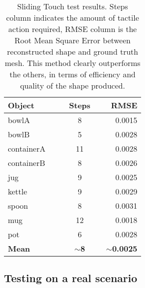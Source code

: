\begin{table}
    \centering
    \begin{tabularx}{0.95\columnwidth}{lccccr}
        \toprule
        Object & & & Steps && RMSE \\
        \midrule
        bowlA & & &8 && 0.0015\\
        bowlB & & &5 && 0.0028\\
        containerA &&& 11 && 0.0028\\
        containerB &&& 8 && 0.0026\\
        jug &&& 9 && 0.0025\\
        kettle &&& 9 && 0.0029\\
        spoon &&& 8 && 0.0031\\
        mug &&& 12 && 0.0018\\
        pot &&& 6 && 0.0028\\
        \midrule
        \textbf{Mean} &&& $\sim$\textbf{8} && $\sim$\textbf{0.0025}\\
        \bottomrule
    \end{tabularx}
    \caption{Sliding Touch test results. Steps column indicates the amount of tactile action required, RMSE
    column is the Root Mean Square Error between reconstructed shape and ground truth mesh. This method clearly
outperforms the others, in terms of efficiency and quality of the shape produced.}
    \label{tab:table3}
\end{table}
\subsection{Testing on a real scenario}
\label{sec:real}



